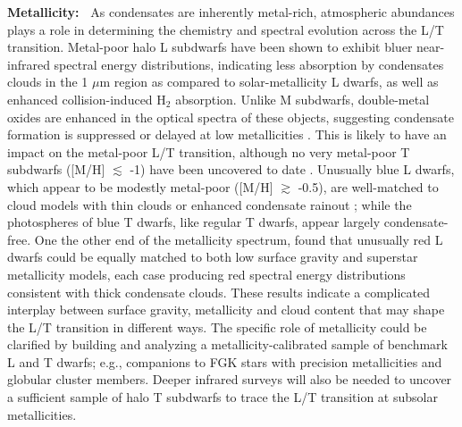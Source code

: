 \documentclass[12pt]{article}
\begin{document}
\begin{justify}

\noindent
\textbf{Metallicity:~}
As condensates are inherently metal-rich, atmospheric abundances plays a role in determining the chemistry and spectral evolution across the L/T transition. Metal-poor halo L subdwarfs \citep{Burgasser2003, Zhang2017} have been shown to exhibit bluer near-infrared spectral energy distributions, indicating less absorption by condensates clouds in the 1 $\mu$m region as compared to solar-metallicity L dwarfs, as well as enhanced collision-induced H$_2$ absorption. Unlike M subdwarfs, double-metal oxides are enhanced in the optical spectra of these objects, suggesting condensate formation is suppressed or delayed at low metallicities \citep{Gizis2006, Burgasser2007}.  This is likely to have an impact on the metal-poor L/T transition, although no very metal-poor T subdwarfs ([M/H] $\lesssim$ -1) have been uncovered to date \citep{Zhang2018}. Unusually blue L dwarfs, which appear to be modestly metal-poor ([M/H] $\gtrsim$ -0.5), are well-matched to cloud models with thin clouds or enhanced condensate rainout \citep{Burgasser2008, Cushing2010}; while the photospheres of blue T dwarfs, like regular T dwarfs, appear largely condensate-free.  One the other end of the metallicity spectrum, \citep{Looper2008} found that unusually red L dwarfs could be equally matched to both low surface gravity and superstar metallicity models, each case producing red spectral energy distributions consistent with thick condensate clouds. These results indicate a complicated interplay between surface gravity, metallicity and cloud content that may shape the L/T transition in different ways. The specific role of metallicity could be clarified by building and analyzing a metallicity-calibrated sample of benchmark L and T dwarfs; e.g., companions to FGK stars with precision metallicities \citep[e.g. Wolf 1130B;][]{Mace2013} and globular cluster members.  Deeper infrared surveys will also be needed to uncover a sufficient sample of halo T subdwarfs to trace the L/T transition at subsolar metallicities.


\end{justify}
\end{document}
